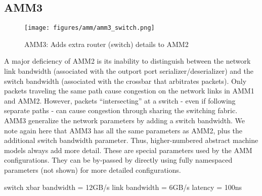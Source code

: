 \subsection{AMM3}
\label{subsec:ammThree}

\begin{figure}
\begin{center}
\texttt{[image: figures/amm/amm3\_switch.png]}
\end{center}
\caption{AMM3: Adds extra router (switch) details to AMM2}
\label{fig:amm3}
\end{figure}

A major deficiency of AMM2 is its inability to distinguish between the network link bandwidth (associated with the outport port serializer/deserializer) and the switch bandwidth (associated with the crossbar that arbitrates packets).  
Only packets traveling the same path cause congestion on the network links in AMM1 and AMM2.
However, packets ``intersecting'' at a switch - even if following separate paths - can cause congestion through sharing the switching fabric.
AMM3 generalize the network parameters by adding a switch bandwidth.
We note again here that AMM3 has all the same parameters as AMM2, plus the additional switch bandwidth parameter.
Thus, higher-numbered abstract machine models always add more detail.
These are special parameters used by the AMM configurations.
They can be by-passed by directly using fully namespaced parameters (not shown) for more detailed configurations.

\begin{ViFile}
switch {
  xbar {
   bandwidth = 12GB/s  
  }
  link {
   bandwidth = 6GB/s
   latency = 100ns
  }
}


\end{ViFile}
